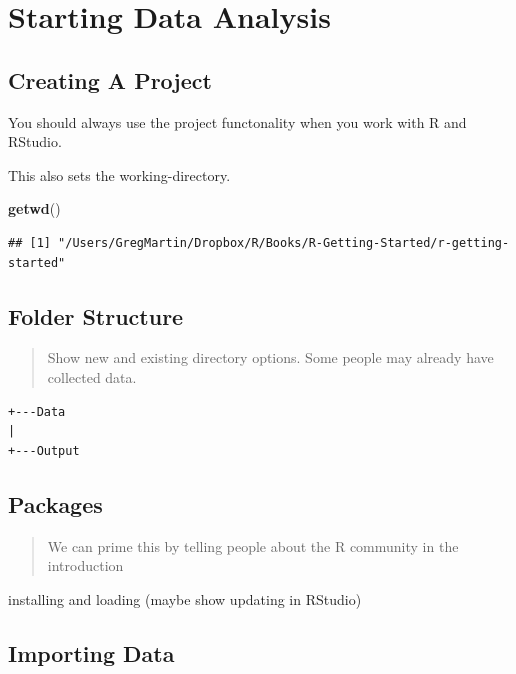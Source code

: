 \documentclass[]{book}
\newenvironment{Shaded}{\begin{snugshade}}{\end{snugshade}}
\newcommand{\KeywordTok}[1]{\textcolor[rgb]{0.13,0.29,0.53}{\textbf{#1}}}
\newcommand{\NormalTok}[1]{#1}
\theoremstyle{definition}
\theoremstyle{definition}
\theoremstyle{definition}
\theoremstyle{remark}
\begin{document}
\chapter{Starting Data Analysis}\label{starting-data-analysis}

\section{Creating A Project}\label{creating-a-project}

You should always use the project functonality when you work with R and
RStudio.

This also sets the working-directory.

\begin{Shaded}
\begin{Highlighting}[]
\KeywordTok{getwd}\NormalTok{()}
\end{Highlighting}
\end{Shaded}

\begin{verbatim}
## [1] "/Users/GregMartin/Dropbox/R/Books/R-Getting-Started/r-getting-started"
\end{verbatim}

\section{Folder Structure}\label{folder-structure}

\begin{quote}
Show new and existing directory options. Some people may already have
collected data.
\end{quote}

\begin{verbatim}
+---Data
|
+---Output
\end{verbatim}

\section{Packages}\label{packages}

\begin{quote}
We can prime this by telling people about the R community in the
introduction
\end{quote}

installing and loading (maybe show updating in RStudio)

\section{Importing Data}\label{importing-data}
\end{document}

